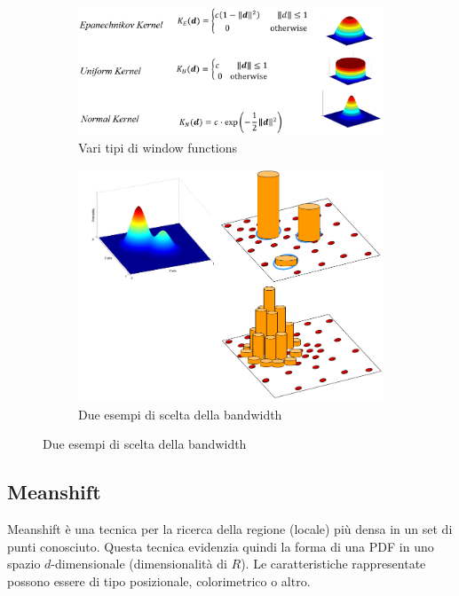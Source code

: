 \documentclass[a4paper,oneside,titlepage]{book}
\begin{document}
\begin{figure}[htp]
	\begin{subfigure}{0.49\textwidth}
	    \centering
		\includegraphics[width=\textwidth, height=\textheight, keepaspectratio]{pw1.png}
		\caption{Vari tipi di window functions}
	\end{subfigure}
	\hfill
	\begin{subfigure}{0.49\textwidth}
	    \centering
		\includegraphics[width=\textwidth, height=\textheight, keepaspectratio]{pw2.png}
		\caption{Due esempi di scelta della bandwidth}
	\end{subfigure}
\end{figure}

\subsection{Meanshift}
Meanshift è una tecnica per la ricerca della regione (locale) più densa in un set di punti conosciuto. Questa tecnica evidenzia quindi la forma di una PDF in uno spazio $d$-dimensionale (dimensionalità di $R$). Le caratteristiche rappresentate possono essere di tipo posizionale, colorimetrico o altro.
\end{document}
